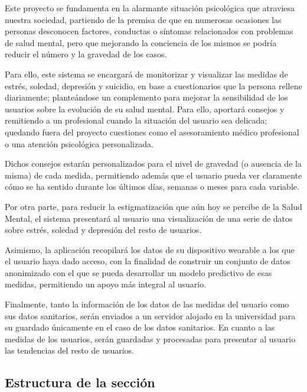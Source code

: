         Este proyecto se fundamenta en la alarmante situación psicológica que atraviesa nuestra sociedad, partiendo de la premisa de que en numerosas ocasiones las personas desconocen factores, conductas o síntomas relacionados con problemas de salud mental, pero que mejorando la conciencia de los mismos se podría reducir el número y la gravedad de los casos.

        Para ello, este sistema se encargará de monitorizar y visualizar las medidas de estrés, soledad, depresión y suicidio, en base a cuestionarios que la persona rellene diariamente; planteándose un complemento para mejorar la sensibilidad de los usuarios sobre la evolución de su salud mental. Para ello, aportará consejos y remitiendo a un profesional cuando la situación del usuario sea delicada; quedando fuera del proyecto cuestiones como el asesoramiento médico profesional o una atención psicológica personalizada.

        Dichos consejos estarán personalizados para el nivel de gravedad (o ausencia de la misma) de cada medida, permitiendo además que el usuario pueda ver claramente cómo se ha sentido durante los últimos días, semanas o meses para cada variable.
        

        Por otra parte, para reducir la estigmatización que aún hoy se percibe de la Salud Mental, el sistema presentará al usuario una visualización de una serie de datos sobre estrés, soledad y depresión del resto de usuarios.

        Asimismo, la aplicación recopilará los datos de su dispositivo \gls{wearable} a los que el usuario haya dado acceso, con la finalidad de construir un conjunto de datos anonimizado con el que se pueda desarrollar un modelo predictivo de esas medidas, permitiendo un apoyo más integral al usuario. 

        Finalmente, tanto la información de los datos de las medidas del usuario como sus datos sanitarios, serán enviados a un servidor alojado en la universidad para su guardado únicamente en el caso de los datos sanitarios. En cuanto a las medidas de los usuarios, serán guardadas y procesadas para presentar al usuario las tendencias del resto de usuarios.

        
    \subsection{Estructura de la sección}

